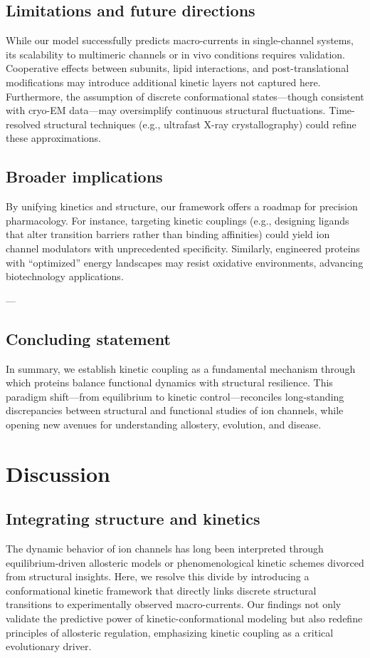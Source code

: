 \documentclass[pdflatex,sn-mathphys-num]{sn-jnl}%
\theoremstyle{thmstyleone}%
\theoremstyle{thmstyletwo}%
\theoremstyle{thmstylethree}%
\begin{document}
\subsection{Limitations and future directions}
While our model successfully predicts macro-currents in single-channel systems, its scalability to multimeric channels or in vivo conditions requires validation. Cooperative effects between subunits, lipid interactions, and post-translational modifications may introduce additional kinetic layers not captured here. Furthermore, the assumption of discrete conformational states—though consistent with cryo-EM data—may oversimplify continuous structural fluctuations. Time-resolved structural techniques (e.g., ultrafast X-ray crystallography) could refine these approximations.  

\subsection{Broader implications} 
By unifying kinetics and structure, our framework offers a roadmap for precision pharmacology. For instance, targeting kinetic couplings (e.g., designing ligands that alter transition barriers rather than binding affinities) could yield ion channel modulators with unprecedented specificity. Similarly, engineered proteins with “optimized” energy landscapes may resist oxidative environments, advancing biotechnology applications.  

---

\subsection{Concluding statement}  
In summary, we establish kinetic coupling as a fundamental mechanism through which proteins balance functional dynamics with structural resilience. This paradigm shift—from equilibrium to kinetic control—reconciles long-standing discrepancies between structural and functional studies of ion channels, while opening new avenues for understanding allostery, evolution, and disease.  

\section{Discussion}

\subsection*{Integrating structure and kinetics}
The dynamic behavior of ion channels has long been interpreted through equilibrium-driven allosteric models or phenomenological kinetic schemes divorced from structural insights. Here, we resolve this divide by introducing a conformational kinetic framework that directly links discrete structural transitions to experimentally observed macro-currents. Our findings not only validate the predictive power of kinetic-conformational modeling but also redefine principles of allosteric regulation, emphasizing kinetic coupling as a critical evolutionary driver. 
\end{document}
